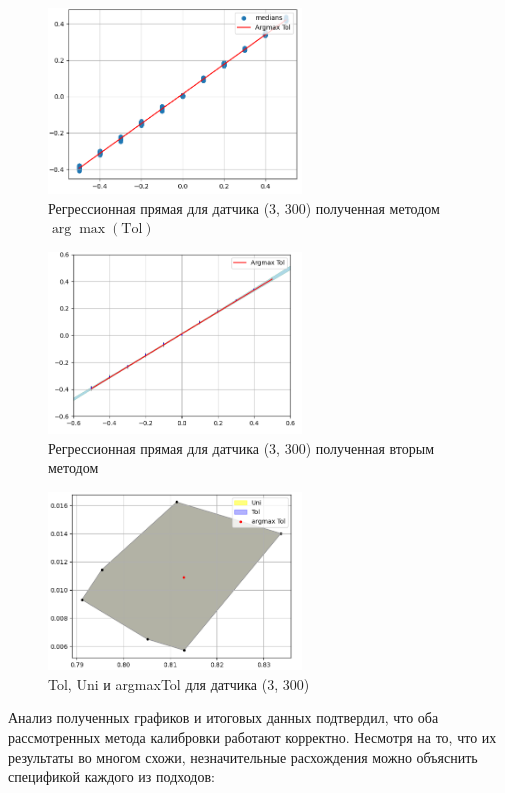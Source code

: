 \documentclass[a4paper,14pt]{extarticle}
\begin{document}
\begin{figure}[htbp]
    \centering
    \includegraphics[width=0.6\textwidth]{f4.png}
    \caption{Регрессионная прямая для датчика (3, 300) полученная методом $\arg\max(\text{Tol})$}
    \label{fig:hamiltonianGraph}
\end{figure}
\clearpage
\begin{figure}[htbp]
    \centering
    \includegraphics[width=0.6\textwidth]{f5.png}
    \caption{Регрессионная прямая для датчика (3, 300) полученная вторым методом}
    \label{fig:hamiltonianGraph}
\end{figure}

\begin{figure}[htbp]
    \centering
    \includegraphics[width=0.6\textwidth]{f6.png}
    \caption{Tol, Uni и argmaxTol для датчика (3, 300)}
    \label{fig:hamiltonianGraph}
\end{figure}
\clearpage
Анализ полученных графиков и итоговых данных подтвердил, что оба рассмотренных метода калибровки работают корректно. Несмотря на то, что их результаты во многом схожи, незначительные расхождения можно объяснить спецификой каждого из подходов:
\end{document}
